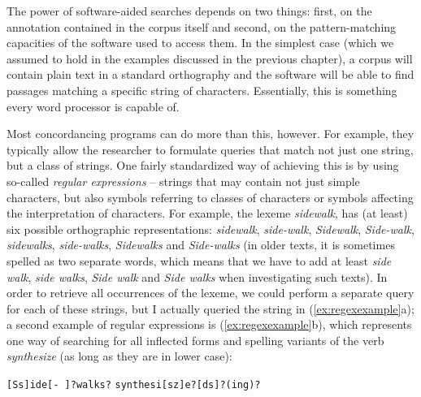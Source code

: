 The power of software\hyp{}aided searches depends on two things: first, on the annotation  contained in the corpus itself and second, on the pattern\hyp{}matching capacities of the software used to access them. In the simplest case (which we assumed to hold in the examples discussed in the previous chapter), a corpus will contain plain text in a standard orthography and the software will be able to find passages matching a specific string of characters. Essentially, this is something every word processor is capable of.

Most concordancing  programs can do more than this, however. For example, they typically allow the researcher to formulate queries  that match not just one string, but a class of strings. One fairly standardized way of achieving this is by using so\hyp{}called \textit{regular expressions} -- strings that may contain not just simple characters, but also symbols referring to classes of characters or symbols affecting the interpretation of characters. For example, the lexeme \textit{sidewalk}, has (at least) six possible orthographic representations: \textit{sidewalk}, \textit{side-walk}, \textit{Sidewalk}, \textit{Side-walk}, \textit{sidewalks}, \textit{side-walks}, \textit{Sidewalks} and \textit{Side-walks} (in older texts, it is sometimes spelled as two separate words, which means that we have to add at least \textit{side walk}, \textit{side walks}, \textit{Side walk} and \textit{Side walks} when investigating such texts). In order to retrieve  all occurrences of the lexeme, we could perform a separate query  for each of these strings, but I actually queried the string in (\ref{ex:regexexample}a); a second example of regular expressions is (\ref{ex:regexexample}b), which represents one way of searching for all inflected forms and spelling variants of the verb  \textit{synthesize} (as long as they are in lower case):

\begin{exe}
\ex
\begin{xlist}
\label{ex:regexexample}
\ex \texttt{[Ss]ide[- ]?walks?}
\ex \texttt{synthesi[sz]e?[ds]?(ing)?}
\end{xlist}
\end{exe}

